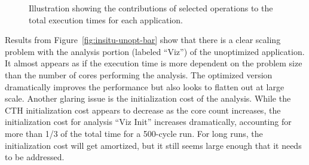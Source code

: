 \begin{figure}[htb]
\begin{centering}
\vspace{-24pt}

\vspace{-24pt}

\vspace{-24pt}

\caption[Breakdown of operation timings.]{Illustration showing the
contributions of selected operations to the total execution times for each
application.} 
\label{fig:runtime-individual-bar}
\end{centering}
\end{figure}


Results from Figure~\ref{fig:insitu-unopt-bar} show that there is a clear
scaling problem with the analysis portion (labeled ``Viz'') of the unoptimized
\insitu application.  It almost appears as if the execution time is more
dependent on the problem size than the number of cores performing the analysis.
The optimized version dramatically improves the performance but also looks to
flatten out at large scale.  Another glaring issue is the initialization cost 
of the analysis.  While the CTH initialization cost appears to decrease as the 
core count increases, the initialization cost for analysis ``Viz Init''
increases dramatically, accounting for more than 1/3 of the total time for a
500-cycle run.  For long runs, the initialization cost will get amortized, but
it still seems large enough that it needs to be addressed. 

